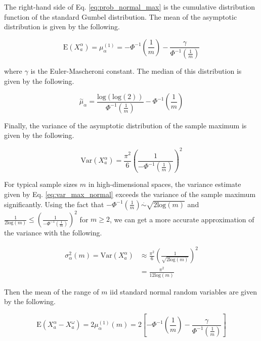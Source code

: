 \documentclass[10pt,letterpaper]{article}\usepackage[]{graphicx}\usepackage[]{color}
\begin{document}
The right-hand side of Eq. \ref{eq:prob_normal_max} is the cumulative distribution function of the standard Gumbel distribution. The mean of the asymptotic distribution is given by the following.

\begin{equation}\label{eq:mu_max_normal}
\text{E}(X^\alpha_a) = \mu^{(1)}_\alpha = -\Phi^{-1} \left(\frac{1}{m}\right) - \frac{\gamma}{\Phi^{-1}\left(\frac{1}{m}\right)}
\end{equation}

\noindent where $\gamma$ is the Euler-Mascheroni constant. The median of this distribution is given by the following.

\begin{equation}\label{eq:med_max_normal}
\overset{\sim}{\mu}_\alpha = \frac{\text{log}(\text{log}(2))}{\Phi^{-1}\left(\frac{1}{m}\right)} - \Phi^{-1}\left(\frac{1}{m}\right)
\end{equation}

Finally, the variance of the asymptotic distribution of the sample maximum is given by the following.

\begin{equation}\label{eq:var_max_normal}
\text{Var}(X^\alpha_a) = \frac{\pi^2}{6}\left(\frac{1}{-\Phi^{-1}\left(\frac{1}{m}\right)}\right)^2
\end{equation}

For typical sample sizes $m$ in high-dimensional spaces, the variance estimate given by Eq. \ref{eq:var_max_normal} exceeds the variance of the sample maximum significantly. Using the fact that $-\Phi^{-1}\left(\frac{1}{m}\right) \overset{.}{\sim} \sqrt{2 \text{log}(m)}$ \cite{cramer1999} and $\frac{1}{2 \text{log}(m)} \leq \left(\frac{1}{-\Phi^{-1}\left(\frac{1}{m}\right)}\right)^2$ for $m \geq 2$, we can get a more accurate approximation of the variance with the following.

\begin{equation}\label{eq:var_max_normal_improved}
\begin{aligned}
\sigma^2_\alpha(m) = \text{Var}(X^\alpha_a) &\approx \frac{\pi^2}{6}\left(\frac{1}{\sqrt{2\text{log}(m)}}\right)^2 \\
&= \frac{\pi^2}{12\text{log}(m)}
\end{aligned}
\end{equation}

Then the mean of the range of $m$ iid standard normal random variables are given by the following.

\begin{equation}\label{eq:mu_rng_normal}
\text{E}(X^\alpha_a - X^\omega_a) = 2\mu^{(1)}_\alpha(m) = 2\left[-\Phi^{-1} \left(\frac{1}{m}\right) - \frac{\gamma}{\Phi^{-1}\left(\frac{1}{m}\right)}\right]
\end{equation}
\end{document}
